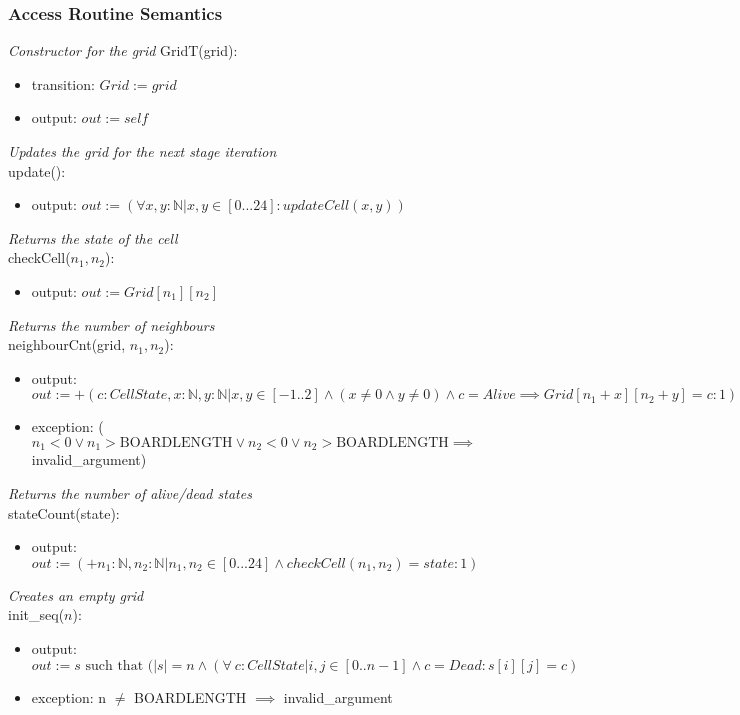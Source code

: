 \documentclass[12pt]{article}
\begin{document}
\subsubsection* {Access Routine Semantics}

\noindent \textsl{Constructor for the grid}
\noindent GridT(grid):
\begin{itemize}
\item transition: 
$Grid := grid$
\item output:
$out := self$
\end{itemize} 

\noindent \textsl{Updates the grid for the next stage iteration}\\
\noindent update():
\begin{itemize}
\item output: 
$out := (\forall x, y : \mathbb{N} | x, y \in [0...24] : updateCell(x, y)) $
\end{itemize}

\noindent \textsl{Returns the state of the cell} \\
\noindent checkCell($n_1, n_2$):
\begin{itemize}
\item output:
$out := Grid[n_1][n_2]$
\end{itemize}

\noindent \textsl{Returns the number of neighbours} \\
\noindent neighbourCnt(grid, $n_1, n_2$):
\begin{itemize}
\item output:
$out := +(c : CellState, x : \mathbb{N}, y : \mathbb{N} | x, y \in [-1..2] \land (x \neq 0 \land y \neq 0) \land c = Alive \implies Grid[n_1 + x][n_2 + y] = c : 1) $
\item exception: ($n_1 < 0 \lor n_1 > \text{BOARDLENGTH} \lor n_2 < 0 \lor n_2 > \text{BOARDLENGTH} \implies$ invalid\_argument)
\end{itemize}

\noindent \textsl{Returns the number of alive/dead states}\\
\noindent stateCount(state):
\begin{itemize}
\item output:
$out := (+n_1 : \mathbb{N}, n_2 : \mathbb{N} | n_1, n_2 \in [0...24] \land checkCell(n_1, n_2) = state: 1)$
\end{itemize}

\noindent \textsl{Creates an empty grid}\\
\noindent init\_seq($n$):
\begin{itemize}
\item output: $out := s \text{ such that } (|s| = n \land (\forall\ c : CellState | i, j
\in [0..n-1] \land c = Dead: s[i][j] = c)$
\item exception: n $\neq$ BOARDLENGTH $\implies$ invalid\_argument \\
\end{itemize}
\end{document}
